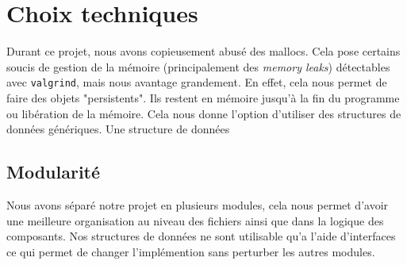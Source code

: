 \section*{Choix techniques}
Durant ce projet, nous avons copieusement abusé des mallocs. Cela pose
certains soucis de gestion de la mémoire (principalement des \emph{memory leaks})
détectables avec \verb|valgrind|, mais nous avantage grandement.
En effet, cela nous permet de faire des
objets "persistents". Ils restent en mémoire jusqu'à la fin du programme
ou libération de la mémoire. Cela nous donne l'option d'utiliser des
structures de données génériques. Une structure de données

\subsection{Modularité}
Nous avons séparé notre projet en plusieurs modules, cela nous permet d'avoir une meilleure organisation au niveau des fichiers
ainsi que dans la logique des composants. Nos structures de données ne sont utilisable qu'a l'aide d'interfaces ce qui permet de changer
l'implémention sans perturber les autres modules. 



